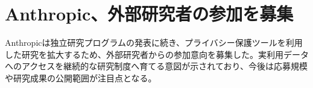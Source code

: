 \section{Anthropic、外部研究者の参加を募集}
Anthropicは独立研究プログラムの発表に続き、プライバシー保護ツールを利用した研究を拡大するため、外部研究者からの参加意向を募集した。実利用データへのアクセスを継続的な研究制度へ育てる意図が示されており、今後は応募規模や研究成果の公開範囲が注目点となる。

